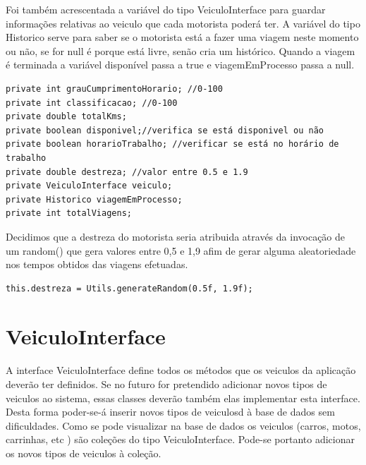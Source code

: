 Foi também acrescentada a variável do tipo VeiculoInterface para guardar informações relativas ao veiculo que cada motorista poderá ter. A variável do tipo Historico serve para saber se o motorista está a fazer uma viagem neste momento ou não, se for null é porque está livre, senão cria um histórico. Quando a viagem é terminada a variável disponível passa a true e viagemEmProcesso passa a null. 

\begin{verbatim}
private int grauCumprimentoHorario; //0-100
private int classificacao; //0-100
private double totalKms; 
private boolean disponivel;//verifica se está disponivel ou não 
private boolean horarioTrabalho; //verificar se está no horário de trabalho
private double destreza; //valor entre 0.5 e 1.9
private VeiculoInterface veiculo; 
private Historico viagemEmProcesso;
private int totalViagens;
\end{verbatim}

Decidimos que a destreza do motorista seria atribuida através da invocação de um random() que gera valores entre 0,5  e 1,9 afim de gerar alguma aleatoriedade nos tempos obtidos das viagens efetuadas. 
\begin{verbatim}
this.destreza = Utils.generateRandom(0.5f, 1.9f); 
\end{verbatim}

\newpage
\section{VeiculoInterface}

A interface VeiculoInterface define todos os métodos que os veiculos da aplicação deverão ter definidos. 
Se no futuro for pretendido adicionar novos tipos de veiculos ao sistema, essas classes deverão também elas implementar esta interface.  Desta forma poder-se-á inserir novos tipos de veiculosd à base de dados sem dificuldades. Como se pode visualizar na base de dados os veiculos (carros, motos, carrinhas, etc ) são coleções do tipo VeiculoInterface. Pode-se portanto adicionar os novos tipos de veiculos à coleção. 



